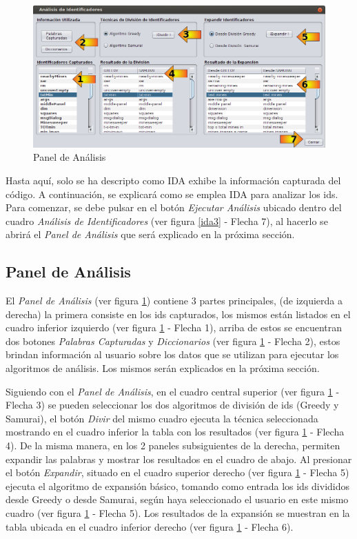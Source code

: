 \begin{figure}[t] %
\centerline{%
\includegraphics[scale= 0.52]{./cap4/ida_06.png}
}
\caption{Panel de Análisis}
\label{ida6}
\end{figure}

Hasta aquí, solo se ha descripto como IDA exhibe la información capturada del código. A continuación, se explicará como se emplea IDA para analizar los ids. Para comenzar, se debe pulsar en el botón \textit{Ejecutar Análisis} ubicado dentro del cuadro \textit{Análisis de Identificadores} (ver figura \ref{ida3} - Flecha 7), al hacerlo se abrirá el \textit{Panel de Análisis} que será explicado en la próxima sección.

\subsection{Panel de Análisis}

El \textit{Panel de Análisis} (ver figura \ref{ida6}) contiene 3 partes principales, (de izquierda a derecha) la primera consiste en los ids capturados, los mismos están listados en el cuadro inferior izquierdo (ver figura \ref{ida6} - Flecha 1), arriba de estos se encuentran dos botones \textit{Palabras Capturadas} y \textit{Diccionarios} (ver figura \ref{ida6} - Flecha 2), estos brindan información al usuario sobre los datos que se utilizan para ejecutar los algoritmos de análisis. Los mismos serán explicados en la próxima sección.

Siguiendo con el \textit{Panel de Análisis}, en el cuadro central superior (ver figura \ref{ida6} - Flecha 3) se pueden seleccionar los dos algoritmos de división de ids (Greedy y Samurai), el botón \textit{Divir} del mismo cuadro ejecuta la técnica seleccionada mostrando en el cuadro inferior la tabla con los resultados (ver figura \ref{ida6} - Flecha 4). De la misma manera, en los 2 paneles subsiguientes de la derecha, permiten expandir las palabras y mostrar los resultados en el cuadro de abajo. Al presionar el botón \textit{Expandir}, situado en el cuadro superior derecho (ver figura \ref{ida6} - Flecha 5) ejecuta el algoritmo de expansión básico, tomando como entrada los ids divididos desde Greedy o desde Samurai, según haya seleccionado el usuario en este mismo cuadro (ver figura \ref{ida6} - Flecha 5). Los resultados de la expansión se muestran en la tabla ubicada en el cuadro inferior derecho (ver figura \ref{ida6} - Flecha 6).

